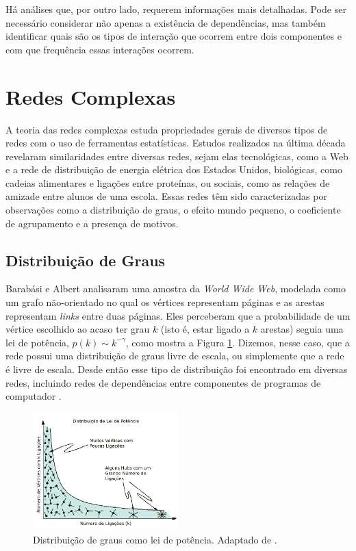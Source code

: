 \documentclass{article}
\begin{document}
Há análises que, por outro lado, requerem informações mais detalhadas. Pode ser necessário considerar não apenas a existência de dependências, mas também identificar quais são os tipos de interação que ocorrem entre dois componentes e com que frequência essas interações ocorrem.

\section{Redes Complexas}

A teoria das redes complexas estuda propriedades gerais de diversos tipos de redes com o uso de ferramentas estatísticas. Estudos realizados na última década revelaram similaridades entre diversas redes, sejam elas tecnológicas, como a Web e a rede de distribuição de energia elétrica dos Estados Unidos, biológicas, como cadeias alimentares e ligações entre proteínas, ou sociais, como as relações de amizade entre alunos de uma escola. Essas redes têm sido caracterizadas por observações como a distribuição de graus, o efeito mundo pequeno, o coeficiente de agrupamento e a presença de motivos.

\subsection{Distribuição de Graus}

Barabási e Albert \cite{Barabasi1999} analisaram uma amostra da \textit{World Wide Web}, modelada como um grafo não-orientado no qual os vértices representam páginas e as arestas representam \textit{links} entre duas páginas. Eles perceberam que a probabilidade de um vértice escolhido ao acaso ter grau $k$ (isto é, estar ligado a $k$ arestas) seguia uma lei de potência, $p(k) \sim k^{-\gamma}$, como mostra a Figura \ref{fig:leidepotencia}. Dizemos, nesse caso, que a rede possui uma distribuição de graus livre de escala, ou simplemente que a rede é livre de escala. Desde então esse tipo de distribuição foi encontrado em diversas redes, incluindo redes de dependências entre componentes de programas de computador \cite{Valverde2003}.

\begin{figure} \label{fig:leidepotencia}
\centering
\includegraphics[width=0.5\textwidth]{leidepotencia}
\caption{Distribuição de graus como lei de potência. Adaptado de \cite{Barabasi2007}.}
\end{figure}
\end{document}
